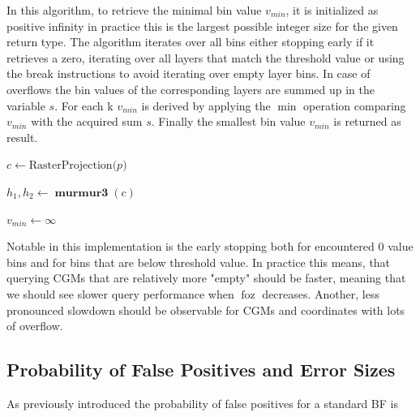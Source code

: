 \documentclass[sigconf, nonacm]{acmart}
\DeclareMathOperator{\foz}{foz}
\DeclareMathOperator{\hash}{\textbf{murmur3}}
\begin{document}
In this algorithm, to retrieve the minimal bin value $v_{min}$, it is initialized as positive infinity in practice this is the largest possible integer size for the given return type. The algorithm iterates over all bins either stopping early if it retrieves a zero, iterating over all layers that match the threshold value or using the break instructions to avoid iterating over empty layer bins. In case of overflows the bin values of the corresponding layers are summed up in the variable $s$. For each k $v_{min}$ is derived by applying the $\min$ operation comparing $v_{min}$ with the acquired sum $s$. Finally the smallest bin value $v_{min}$ is returned as result.

\begin{algorithm}
  \SetAlgoLined


  $c \leftarrow \text{RasterProjection(}p\text{)}$

  $h_1, h_2 \leftarrow \hash(c)$

  $v_{min} \leftarrow \infty$

  \caption{GET Operation}
  \label{ls:get-operation}
\end{algorithm}

Notable in this implementation is the early stopping both for encountered $0$ value bins and for bins that are below threshold value.
In practice this means, that querying CGMs that are relatively more "empty" should be faster, meaning that we should see slower query performance when $\foz$ decreases. Another, less pronounced slowdown should be observable for CGMs and coordinates with lots of overflow.


\subsection{Probability of False Positives and Error Sizes}


As previously introduced the probability of false positives for a standard BF is
\end{document}
